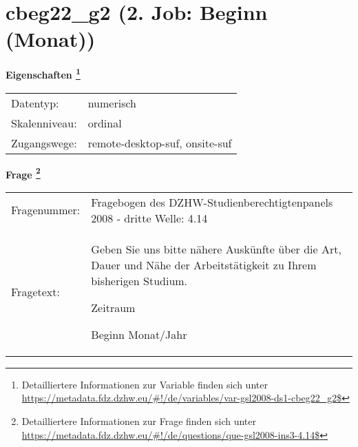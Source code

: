 
    \setcounter{footnote}{0}

    \vspace*{-1.8cm}
	\section{cbeg22\_g2 (2. Job: Beginn (Monat))}
	\label{section:cbeg22_g2}



    \vspace*{0.5cm}
    \noindent\textbf{Eigenschaften
	\footnote{Detailliertere Informationen zur Variable finden sich unter
		\url{https://metadata.fdz.dzhw.eu/\#!/de/variables/var-gsl2008-ds1-cbeg22_g2$}}}\\
	\begin{tabularx}{\hsize}{@{}lX}
	Datentyp: & numerisch \\
	Skalenniveau: & ordinal \\
	Zugangswege: &
	  remote-desktop-suf, 
	  onsite-suf
 \\
    \end{tabularx}



				\vspace*{0.5cm}
                \noindent\textbf{Frage
	                \footnote{Detailliertere Informationen zur Frage finden sich unter
		              \url{https://metadata.fdz.dzhw.eu/\#!/de/questions/que-gsl2008-ins3-4.14$}}}\\
				\begin{tabularx}{\hsize}{@{}lX}
					Fragenummer: &
					  Fragebogen des DZHW-Studienberechtigtenpanels 2008 - dritte Welle:
					  4.14
 \\
					Fragetext: & Geben Sie uns bitte nähere Auskünfte über die Art, Dauer und Nähe der Arbeitstätigkeit zu Ihrem bisherigen Studium.\par  Zeitraum\par  Beginn Monat/Jahr \\
				\end{tabularx}





